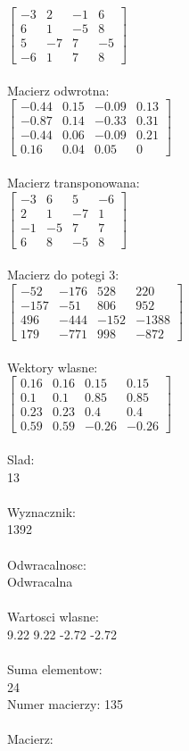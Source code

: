 \documentclass[a4paper,12pt]{article}
\begin{document}
$\begin{bmatrix} -3&2&-1&6\\6&1&-5&8\\5&-7&7&-5\\-6&1&7&8 \end{bmatrix}$
\\
\\
Macierz odwrotna:\\

$\begin{bmatrix} -0.44&0.15&-0.09&0.13\\-0.87&0.14&-0.33&0.31\\-0.44&0.06&-0.09&0.21\\0.16&0.04&0.05&0 \end{bmatrix}$
\\
\\
Macierz transponowana:\\

$\begin{bmatrix} -3&6&5&-6\\2&1&-7&1\\-1&-5&7&7\\6&8&-5&8 \end{bmatrix}$
\\
\\
Macierz do potegi 3:\\

$\begin{bmatrix} -52&-176&528&220\\-157&-51&806&952\\496&-444&-152&-1388\\179&-771&998&-872 \end{bmatrix}$
\\
\\
Wektory wlasne:\\

$\begin{bmatrix} 0.16&0.16&0.15&0.15\\0.1&0.1&0.85&0.85\\0.23&0.23&0.4&0.4\\0.59&0.59&-0.26&-0.26 \end{bmatrix}$
\\
\\
Slad:\\
13
\\
\\
Wyznacznik:\\
1392
\\
\\
Odwracalnosc:\\
Odwracalna
\\
\\
Wartosci wlasne:\\
9.22 9.22 -2.72 -2.72
\\
\\
Suma elementow:\\
24
\\
\newpage
Numer macierzy:
135
\\
\\
Macierz:\\
\end{document}
